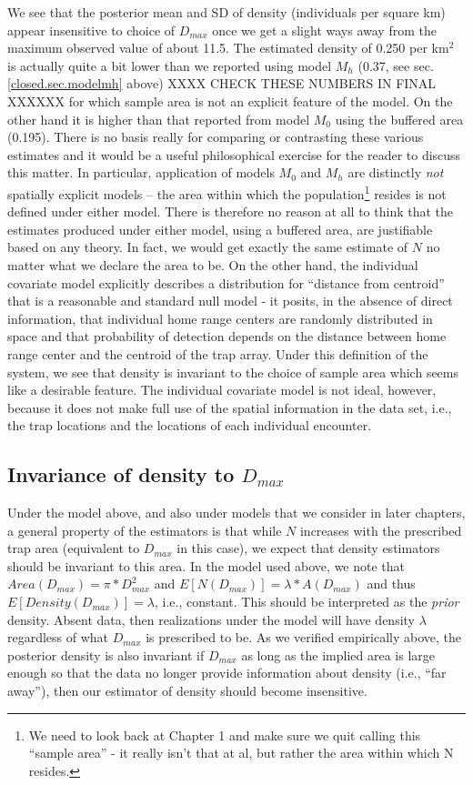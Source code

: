 We see that the posterior mean and SD of density (individuals per
square km) appear insensitive to choice of $D_{max}$ once we get a slight
ways away from the maximum observed value of about 11.5. The estimated
density of 0.250 per km$^2$ is actually quite a bit lower than we
reported using model $M_h$ (0.37, see sec.
\ref{closed.sec.modelmh} above)   XXXX CHECK THESE NUMBERS IN FINAL XXXXXX
 for which sample
area is not an explicit feature of the model. On the other hand it is
higher than that reported from model $M_0$ using the buffered area
(0.195). There is no basis really for comparing or contrasting these
various estimates and it would be a useful philosophical exercise for
the reader to discuss this matter. In particular, application of models
$M_0$ and $M_h$ are distinctly {\it not} spatially explicit models -- the
area within which the population\footnote{We need to look back at
  Chapter 1 and make sure we quit calling this ``sample area'' - it
  really isn't that at al, but rather the area within which N
  resides.} resides is not defined under either model. There is
therefore no reason at all to think that the estimates produced under
either model, using a buffered area, are justifiable based on any
theory. In fact, we would get exactly the same estimate of $N$ no
matter what we declare the area to be. On the other hand, the
individual covariate model explicitly describes a distribution for
``distance from centroid'' that is a reasonable and standard null
model - it posits, in the absence of direct information, that
individual home range centers are randomly distributed in space and
that probability of detection depends on the distance between home
range center and the centroid of the trap array. Under this definition
of the system, we see that density is invariant to the choice of
sample area which seems like a desirable feature. The individual
covariate model is not ideal, however, because it does not make full
use of the spatial information in the data set, i.e., the trap
locations and the locations of each individual encounter.


\subsection{Invariance of density to $D_{max}$}

Under the model above, and also under models that we consider in later
chapters, a general property of the estimators is that while $N$
increases with the prescribed trap area (equivalent to $D_{max}$ in this
case), we expect that density estimators should be invariant to this
area. In the model used above, we note that $Area(D_{max}) = 
\pi*D_{max}^{2}$ and $E[N(D_{max})] = \lambda*A(D_{max})$ and thus
$E[Density(D_{max})] = \lambda$, i.e., constant. This should be 
interpreted as the {\it prior} density. Absent data, then realizations
under the model will have density $\lambda$ regardless of what $D_{max}$
is prescribed to be.  As we verified empirically above, the posterior
density is also invariant if $D_{max}$ as long as the implied area
is large enough so that the data no longer provide
information about density (i.e., ``far away''), then our estimator of
density should become insensitive.

